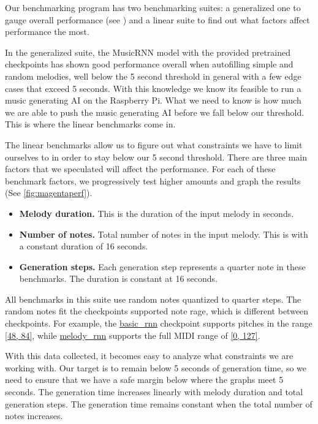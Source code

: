 Our benchmarking program has two benchmarking suites: a generalized one to gauge overall
performance (see ) and a linear suite to find out what
factors affect performance the most.

In the generalized suite, the MusicRNN model with the provided pretrained checkpoints has
shown good performance overall when autofilling simple and random melodies, well below the
5 second threshold in general with a few edge cases that exceed 5 seconds. With this
knowledge we know its feasible to run a music generating AI on the Raspberry Pi. What we
need to know is how much we are able to push the music generating AI before we fall below
our threshold. This is where the linear benchmarks come in.

The linear benchmarks allow us to figure out what constraints we have to limit ourselves
to in order to stay below our 5 second threshold. There are three main factors that we
speculated will affect the performance. For each of these benchmark factors, we
progressively test higher amounts and graph the results (See \autoref{fig:magentaperf}).

\begin{itemize}
  \item \textbf{Melody duration.} This is the duration of the input melody in seconds.
  \item \textbf{Number of notes.} Total number of notes in the input melody. This is with
        a constant duration of 16 seconds.
  \item \textbf{Generation steps.} Each generation step represents a quarter note in these
        benchmarks. The duration is constant at 16 seconds.
\end{itemize}

All benchmarks in this suite use random notes quantized to quarter steps. The random notes
fit the checkpoints supported note rage, which is different between checkpoints. For
example, the \url{basic_rnn} checkpoint supports pitches in the range \url{[48, 84]},
while \url{melody_rnn} supports the full MIDI range of \url{[0, 127]}.

With this data collected, it becomes easy to analyze what constraints we are working
with. Our target is to remain below 5 seconds of generation time, so we need to ensure
that we have a safe margin below where the graphs meet 5 seconds. The generation time
increases linearly with melody duration and total generation steps. The generation time
remains constant when the total number of notes increases.

